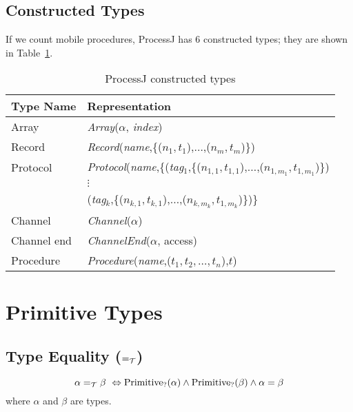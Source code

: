 \documentclass[]{article}
\begin{document}
\subsection{Constructed Types}
If we count mobile procedures, ProcessJ has 6 constructed types; they are shown in Table~\ref{tab:constructedTypes}.
\begin{table}[!h]
  \begin{center}
    \caption{ProcessJ constructed types}
    \label{tab:constructedTypes} 
    \begin{tabular}{|l|l|}\hline
      Type Name & Representation \\ \hline\hline
      Array    & {\it Array}($\alpha$, {\it index})\\
      Record   & {\it Record}({\it name},\{($n_1,t_1$),$\ldots$,($n_m,t_m$)\})\\
      Protocol & {\it Protocol}({\it name},\{({\it tag}$_1$,\{($n_{1,1},t_{1,1}$),$\ldots$,($n_{1,m_1},t_{1,m_1}$)\})\\
               & \hspace*{2.6cm}$\vdots$\\
      & \hspace*{2.475cm}({\it tag}$_k$,\{($n_{k,1},t_{k,1}$),$\ldots$,($n_{k,m_k},t_{1,m_k}$)\})\}\\
      Channel  & {\it Channel}($\alpha$)\\
      Channel end & {\it ChannelEnd}($\alpha$, access)\\ 
      Procedure & {\it Procedure}({\it name},($t_1,t_2,\ldots,t_n$),$t$)\\\hline
    \end{tabular}
  \end{center}
\end{table}

\newcommand{\teq}{=_{\cal T}}
\newcommand{\tev}{\sim_{\cal T}}
\newcommand{\tac}{:=_{\cal T}}
\newcommand{\tlt}{<_{\cal T}}
\newcommand{\tle}{\leq_{\cal T}}

\section{Primitive Types}

\subsection{Type Equality ($\teq$)}

\[
\alpha \teq \beta\ \Leftrightarrow \mbox{Primitive}_?(\alpha) \wedge \mbox{Primitive}_?(\beta) \wedge \alpha = \beta
\]
where $\alpha$ and $\beta$ are types.
\end{document}
